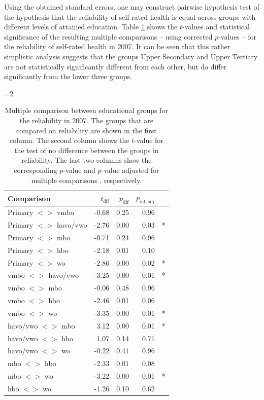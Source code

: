 \documentclass[a4paper, 11pt]{article}
\newcommand{\0}{\boldsymbol{0}}
\begin{document}
Using the obtained standard errors, one may construct pairwise hypothesis test of the hypothesis that the reliability of self-rated health
is equal across groups with different levels of attained education. Table \ref{tab:tests} shows the $t$-values and statistical significance of the resulting multiple comparisons -- using corrected $p$-values  \citep{holm1979simple} -- for the reliability of self-rated health in 2007. It can be seen that this rather simplistic analysis suggests that the 
groups Upper Secondary and Upper Tertiary are not statistically significantly different from each other, but do 
differ significantly from the lower three groups.

=2
\begin{table}[ht]
\begin{center}
\begin{tabular}{lrrrl}
  \hline  \hline
 Comparison & $t_{\mathrm{dif}}$ & $p_{\mathrm{dif}}$ & $p_{\mathrm{dif,adj}}$ &  \\ 
  \hline
Primary $<$$>$ vmbo & -0.68 & 0.25 & 0.96 &  \\ 
Primary $<$$>$ havo/vwo & -2.76 & 0.00 & 0.03 & * \\ 
Primary $<$$>$ mbo & -0.71 & 0.24 & 0.96 &  \\ 
Primary $<$$>$ hbo & -2.18 & 0.01 & 0.10 &  \\ 
Primary $<$$>$ wo & -2.86 & 0.00 & 0.02 & * \\ 
vmbo $<$$>$ havo/vwo & -3.25 & 0.00 & 0.01 & * \\ 
vmbo $<$$>$ mbo & -0.06 & 0.48 & 0.96 &  \\ 
vmbo $<$$>$ hbo & -2.46 & 0.01 & 0.06 &  \\ 
vmbo $<$$>$ wo & -3.35 & 0.00 & 0.01 & * \\ 
 havo/vwo $<$$>$ mbo & 3.12 & 0.00 & 0.01 & * \\ 
 havo/vwo $<$$>$ hbo & 1.07 & 0.14 & 0.71 &  \\ 
 havo/vwo $<$$>$ wo & -0.22 & 0.41 & 0.96 &  \\ 
 mbo $<$$>$ hbo & -2.33 & 0.01 & 0.08 &  \\ 
 mbo $<$$>$ wo & -3.22 & 0.00 & 0.01 & * \\ 
 hbo $<$$>$ wo & -1.26 & 0.10 & 0.62 &  \\ 
   \hline  \hline
\end{tabular}\caption{Multiple comparison between educational groups for the reliability in 2007. 
	The groups that are compared on reliability are shown in the first column. The second column shows the
	$t$-value for the test of no difference between the groups in reliability. The last two columns show 
	the corresponding $p$-value and $p$-value adjusted for multiple comparisons \citep{holm1979simple}, respectively.}\label{tab:tests}
\end{center}
\end{table}
\end{document}
